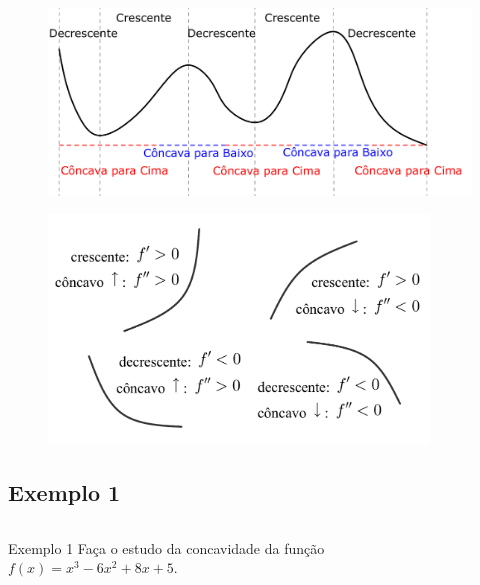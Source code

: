 \begin{frame}
  \vspace{0.75cm}
  \begin{figure}
    \includegraphics[width=\textwidth]{figuras/figura1.pdf}
  \end{figure}
\end{frame}

\begin{frame}
  \begin{figure}
    \includegraphics[width=0.9\textwidth]{figuras/figura2.pdf}
  \end{figure}
\end{frame}

\subsection{Exemplo 1}
\begin{frame}
  \begin{columns}[onlytextwidth]
    \begin{column}{0.5\textwidth}\vspace{-0.85cm}
      \begin{block}{Exemplo 1}
        Faça o estudo da concavidade da função $f(x) = x^{3} - 6x^{2} + 8x + 5$.
      \end{block}
    \end{column}
    \begin{column}{0.5\textwidth}\vspace{-0.75cm}
    \end{column}
  \end{columns}
\end{frame}

